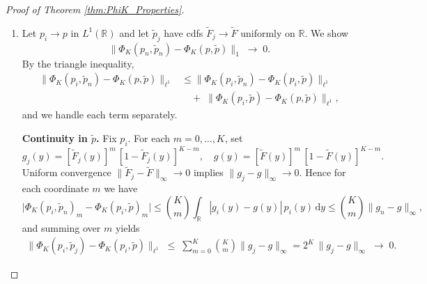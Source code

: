 \documentclass{article}
\begin{document}
\begin{proof}[Proof of Theorem \ref{thm:PhiK_Properties}]
\begin{enumerate}[label=(\roman*)]
    Define
    \[
    \mathbb Q = (0,1,0)\in\Delta^2,
    \]
    so that \(\mathbb Q(0)=0\), \(\mathbb Q(1)=1\), and \(\mathbb Q(2)=0\).  Suppose, for the sake of contradiction, that there exist densities \(p,\tilde p\) on \(\mathbb{R}\) with cdf \(\tilde F\) such that
    \(\Phi_2(p,\tilde p)=\mathbb Q\).  Then by definition
    \begin{align*}
    \mathbb Q(0)
    &=\int_\mathbb{R} [1-\tilde F(y)]^2\,p(y)\,\mathrm{d} y = 0,\\
    \mathbb Q(1)
    &=2\int_\mathbb{R} \tilde F(y)\,[1-\tilde F(y)]\,p(y)\,\mathrm{d} y = 1,\\
    \mathbb Q(2)
    &=\int_\mathbb{R} [\tilde F(y)]^2\,p(y)\,\mathrm{d} y = 0.
    \end{align*}
    The first and third equations force
    \[
    [1-\tilde F(y)]^2=0
    \quad\text{and}\quad
    [\tilde F(y)]^2=0
    \quad
    \text{\(p\)-almost everywhere,}
    \]
    hence \(\tilde F(y)=1\) and \(\tilde F(y)=0\) \(p\)-a.e.  Since \(p\) is a probability density, its support has positive measure, so we cannot have \(\tilde F\equiv1\) and \(\tilde F\equiv0\) on that support.  This contradiction shows no \((p,\tilde p)\) can produce \(\mathbb Q=(0,1,0)\).  Therefore \(\Phi_2\), and hence \(\Phi_K\) for general \(K\), fails to be surjective.

    \item Let \(p_i\to p\) in \(L^1(\mathbb{R})\) and let \(\tilde p_j\) have cdfs \(\tilde F_j\to\tilde F\) uniformly on $\mathbb{R}$.  We show
    \[
    \bigl\|\Phi_K(p_n,\tilde p_n)-\Phi_K(p,\tilde p)\bigr\|_{1}
    \;\to\;0.
    \]
    By the triangle inequality,
    \begin{align}\label{eq1:proof continuity of phi}
    \nonumber\bigl\|\Phi_K(p_i,\tilde p_n)-\Phi_K(p,\tilde p)\bigr\|_{\ell^1}
    &\le 
    \bigl\|\Phi_K(p_i,\tilde p_n)-\Phi_K(p_i,\tilde p)\bigr\|_{\ell^1}\\
    &\quad 
    +\;\bigl\|\Phi_K(p_i,\tilde p)-\Phi_K(p,\tilde p)\bigr\|_{\ell^1},
    \end{align}
    and we handle each term separately.
    
    \medskip\noindent
    \textbf{Continuity in \(\tilde p\).}  Fix \(p_i\).  For each \(m=0,\dots,K\), set
    \[
    g_j(y)
    =[\tilde F_j(y)]^m\,[1-\tilde F_j(y)]^{K-m},
    \quad
    g(y)
    =[\tilde F(y)]^m\,[1-\tilde F(y)]^{K-m}.
    \]
    Uniform convergence \(\|\tilde F_j-\tilde F\|_\infty\to0\) implies \(\|g_j-g\|_\infty\to0\).  Hence for each coordinate $m$ we have
    \[
    \bigl|\Phi_K(p_i,\tilde p_n)_m-\Phi_K(p_i,\tilde p)_m\bigr|
    \le\binom Km\int_{\mathbb{R}}|g_i(y)-g(y)|\,p_i(y)\,\mathrm{d} y
    \le\binom Km\|g_n-g\|_\infty,
    \]
    and summing over \(m\) yields
    \begin{align}\label{eq2:proof continuity of phi}
    \bigl\|\Phi_K(p_i,\tilde p_j)-\Phi_K(p_i,\tilde p)\bigr\|_{\ell^1}
    \;\le\;
    \sum_{m=0}^K\binom Km\|g_j-g\|_\infty
    =2^K\,\|g_j-g\|_\infty
    \;\longrightarrow\;0.
    \end{align}
    

\end{enumerate}
\end{proof}
\end{document}
